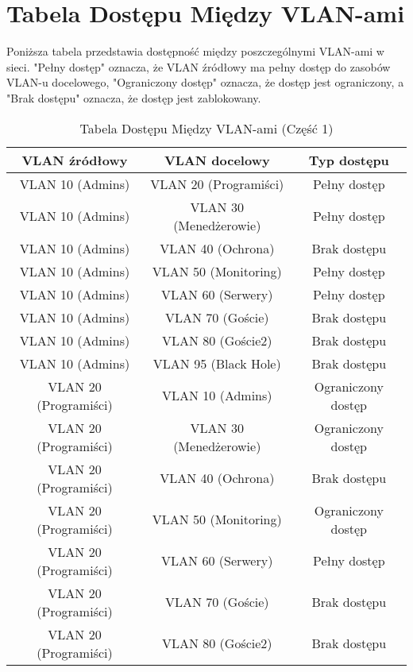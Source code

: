 \section{Tabela Dostępu Między VLAN-ami}

Poniższa tabela przedstawia dostępność między poszczególnymi VLAN-ami w sieci. "Pełny dostęp" oznacza, że VLAN źródłowy ma pełny dostęp do zasobów VLAN-u docelowego, "Ograniczony dostęp" oznacza, że dostęp jest ograniczony, a "Brak dostępu" oznacza, że dostęp jest zablokowany.

\begin{table}[htbp]
\centering
\caption{Tabela Dostępu Między VLAN-ami (Część 1)}
\begin{tabular}{|c|c|c|}
\hline
\textbf{VLAN źródłowy} & \textbf{VLAN docelowy} & \textbf{Typ dostępu} \\ \hline
VLAN 10 (Admins)       & VLAN 20 (Programiści)  & Pełny dostęp         \\ \hline
VLAN 10 (Admins)       & VLAN 30 (Menedżerowie) & Pełny dostęp         \\ \hline
VLAN 10 (Admins)       & VLAN 40 (Ochrona)      & Brak dostępu         \\ \hline
VLAN 10 (Admins)       & VLAN 50 (Monitoring)   & Pełny dostęp         \\ \hline
VLAN 10 (Admins)       & VLAN 60 (Serwery)      & Pełny dostęp         \\ \hline
VLAN 10 (Admins)       & VLAN 70 (Goście)       & Brak dostępu         \\ \hline
VLAN 10 (Admins)       & VLAN 80 (Goście2)      & Brak dostępu         \\ \hline
VLAN 10 (Admins)       & VLAN 95 (Black Hole)   & Brak dostępu         \\ \hline
VLAN 20 (Programiści)  & VLAN 10 (Admins)       & Ograniczony dostęp   \\ \hline
VLAN 20 (Programiści)  & VLAN 30 (Menedżerowie) & Ograniczony dostęp   \\ \hline
VLAN 20 (Programiści)  & VLAN 40 (Ochrona)      & Brak dostępu         \\ \hline
VLAN 20 (Programiści)  & VLAN 50 (Monitoring)   & Ograniczony dostęp   \\ \hline
VLAN 20 (Programiści)  & VLAN 60 (Serwery)      & Pełny dostęp         \\ \hline
VLAN 20 (Programiści)  & VLAN 70 (Goście)       & Brak dostępu         \\ \hline
VLAN 20 (Programiści)  & VLAN 80 (Goście2)      & Brak dostępu         \\ \hline

\end{tabular}
\end{table}
